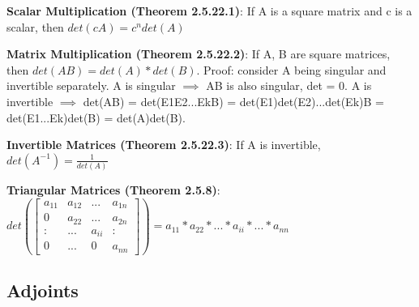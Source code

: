 \documentclass[a4paper,landscape]{article}
\newcommand{\rntopic}[1]{\vspace{-2.0em}\subsection*{#1}\vspace{-1.0em}}
\newcommand{\rnname}[1]{\textbf{#1}}
\begin{document}
\begin{multicols*}{4}
\begin{flatitemize}
\item \rnname{Scalar Multiplication (Theorem 2.5.22.1)}: If A is a square matrix and c is a scalar, then $det(cA) = c^ndet(A)$
\item \rnname{Matrix Multiplication (Theorem 2.5.22.2)}: If A, B are square matrices, then $det(AB) = det(A) * det(B)$. Proof: consider A being singular and invertible separately. A is singular $\implies$ AB is also singular, det = 0. A is invertible $\implies$ det(AB) = det(E1E2...EkB) = det(E1)det(E2)...det(Ek)B = det(E1...Ek)det(B) = det(A)det(B).
\item \rnname{Invertible Matrices (Theorem 2.5.22.3)}: If A is invertible, $det(A^{-1}) = \frac{1}{det(A)}$

\item \rnname{Triangular Matrices (Theorem 2.5.8)}:
$det(\begin{bmatrix}
	a_{11} & a_{12} & ... & a_{1n} \\
    0      & a_{22} & ... & a_{2n} \\
    :      &   ...    & a_{ii} & : \\
    0      &   ...    & 0   & a_{nn} 
\end{bmatrix}) = a_{11}*a_{22}* ... * a_{ii} * ... * a_{nn}$

\end{flatitemize}


\rntopic{Adjoints}


\end{multicols*}
\end{document}

